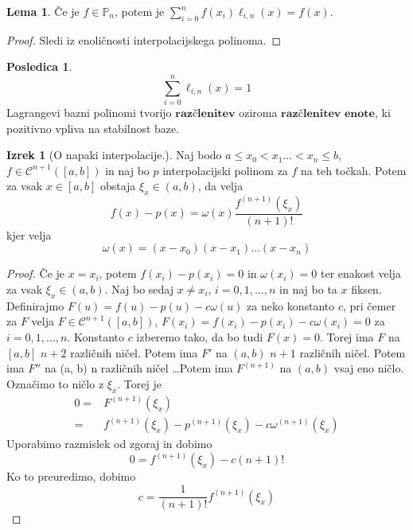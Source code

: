 \documentclass[a4paper,12pt]{article}
\theoremstyle{definition}
\newtheorem{lemma}[counter]{Lema}
\newtheorem{conseq}[counter]{Posledica}
\newtheorem{theorem}[counter]{Izrek}
\theoremstyle{remark}
\newcommand{\Pp}{\mathbb{P}}
\begin{document}
\begin{lemma}
    Če je $f \in \Pp_n$, potem je $\sum_{i = 0}^{n} f(x_i) \ell_{i, n} (x) = f(x)$.
\end{lemma}
\begin{proof}
    Sledi iz enoličnosti interpolacijskega polinoma.
\end{proof}

\begin{conseq}
    \begin{equation}
        \sum_{i = 0}^{n} \ell_{i, n}(x) = 1
    \end{equation}
    Lagrangevi bazni polinomi tvorijo $\textbf{razčlenitev}$ oziroma $\textbf{razčlenitev enote}$, ki pozitivno vpliva na stabilnost baze.
\end{conseq}

\begin{theorem}[O napaki interpolacije.]
    Naj bodo $a \leq x_0 < x_1 \dots < x_n \leq b$, $f \in \mathscr{C}^{n+1}([a, b])$ in naj bo $p$ interpolacijski polinom za $f$ na teh točkah. Potem za vsak $x \in [a, b]$
    obstaja $\xi_x \in (a, b)$, da velja
    \begin{equation*}
        f(x) - p(x) = \omega (x) \frac{f^{(n+1)}(\xi_x)}{(n+1)!}
    \end{equation*}
    kjer velja
    \begin{equation*}
        \omega (x) = (x - x_0)(x-x_1) \dots (x - x_n)
    \end{equation*}
\end{theorem}

\begin{proof}
    Če je $x = x_i$, potem $f(x_i) - p(x_i) = 0$ in $\omega (x_i) = 0$ ter enakost velja za vsak $\xi_x \in (a, b)$. Naj bo sedaj $x \neq x_i$, $i = 0, 1, \dots, n$
    in naj bo ta $x$ fiksen.
    Definirajmo $F(u) = f(u) - p(u) - c \omega (u)$ za neko konstanto $c$, pri čemer za $F$ velja $F \in \mathscr{C}^{n+1}([a, b])$, $F(x_i) = f(x_i) - p(x_i) - c \omega (x_i) = 0$ za $i = 0, 1, \dots, n$.
    Konstanto $c$ izberemo tako, da bo tudi $F(x) = 0$. Torej ima $F$ na $[a, b]$ $n+2$ različnih ničel. Potem ima $F'$ na $(a, b)$ $n+1$ različnih ničel.
    Potem ima $F''$ na (a, b) n različnih ničel \dots Potem ima $F^{(n+1)}$ na $(a, b)$ vsaj eno ničlo. Označimo to ničlo z $\xi_x$. Torej je
    \begin{align*}
        0 =& F^{(n+1)}(\xi_x) \\
          =& f^{(n+1)}(\xi_x) - p^{(n+1)}(\xi_x) - c \omega ^{(n+1)}(\xi_x)
    \end{align*}
    Uporabimo razmislek od zgoraj in dobimo
    \begin{equation*}
        0 = f^{(n+1)}(\xi_x) - c (n+1)!
    \end{equation*}
    Ko to preuredimo, dobimo
    \begin{equation*}
        c = \frac{1}{(n+1)!}f^{(n+1)}(\xi_x)
    \end{equation*}
\end{proof}
\end{document}
